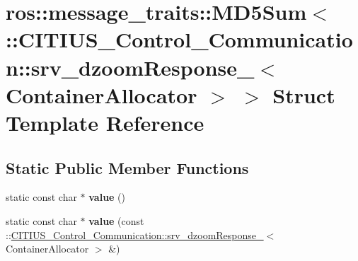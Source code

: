 \hypertarget{structros_1_1message__traits_1_1_m_d5_sum_3_01_1_1_c_i_t_i_u_s___control___communication_1_1srv_16d2f033488123f9178b01919fb11e57}{\section{ros\-:\-:message\-\_\-traits\-:\-:\-M\-D5\-Sum$<$ \-:\-:\-C\-I\-T\-I\-U\-S\-\_\-\-Control\-\_\-\-Communication\-:\-:srv\-\_\-dzoom\-Response\-\_\-$<$ \-Container\-Allocator $>$ $>$ \-Struct \-Template \-Reference}
\label{structros_1_1message__traits_1_1_m_d5_sum_3_01_1_1_c_i_t_i_u_s___control___communication_1_1srv_16d2f033488123f9178b01919fb11e57}
}
\subsection*{\-Static \-Public \-Member \-Functions}
\begin{DoxyCompactItemize}
\item 
\hypertarget{structros_1_1message__traits_1_1_m_d5_sum_3_01_1_1_c_i_t_i_u_s___control___communication_1_1srv_16d2f033488123f9178b01919fb11e57_ac62e235480901021cff2cd34aafeb4f7}{static const char $\ast$ {\bfseries value} ()}\label{structros_1_1message__traits_1_1_m_d5_sum_3_01_1_1_c_i_t_i_u_s___control___communication_1_1srv_16d2f033488123f9178b01919fb11e57_ac62e235480901021cff2cd34aafeb4f7}

\item 
\hypertarget{structros_1_1message__traits_1_1_m_d5_sum_3_01_1_1_c_i_t_i_u_s___control___communication_1_1srv_16d2f033488123f9178b01919fb11e57_a0fbd1587f6660ad7bbc62d7767331bc7}{static const char $\ast$ {\bfseries value} (const \-::\hyperlink{struct_c_i_t_i_u_s___control___communication_1_1srv__dzoom_response__}{\-C\-I\-T\-I\-U\-S\-\_\-\-Control\-\_\-\-Communication\-::srv\-\_\-dzoom\-Response\-\_\-}$<$ \-Container\-Allocator $>$ \&)}\label{structros_1_1message__traits_1_1_m_d5_sum_3_01_1_1_c_i_t_i_u_s___control___communication_1_1srv_16d2f033488123f9178b01919fb11e57_a0fbd1587f6660ad7bbc62d7767331bc7}

\end{DoxyCompactItemize}
